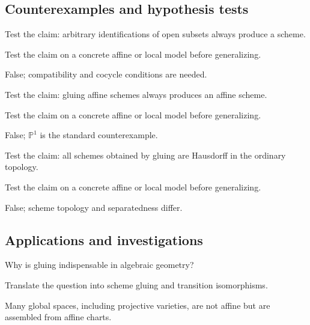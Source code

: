 \subsection*{Counterexamples and hypothesis tests}

\begin{exercise}\label{exr:vi20-expand-10}
Test the claim: arbitrary identifications of open subsets always produce a scheme.
\end{exercise}
\begin{hint}
Test the claim on a concrete affine or local model before generalizing.
\end{hint}
\begin{solution}
False; compatibility and cocycle conditions are needed.
\end{solution}

\begin{exercise}\label{exr:vi20-expand-11}
Test the claim: gluing affine schemes always produces an affine scheme.
\end{exercise}
\begin{hint}
Test the claim on a concrete affine or local model before generalizing.
\end{hint}
\begin{solution}
False; $\mathbb P^1$ is the standard counterexample.
\end{solution}

\begin{exercise}\label{exr:vi20-expand-12}
Test the claim: all schemes obtained by gluing are Hausdorff in the ordinary topology.
\end{exercise}
\begin{hint}
Test the claim on a concrete affine or local model before generalizing.
\end{hint}
\begin{solution}
False; scheme topology and separatedness differ.
\end{solution}

\subsection*{Applications and investigations}

\begin{exercise}\label{exr:vi20-expand-13}
Why is gluing indispensable in algebraic geometry?
\end{exercise}
\begin{hint}
Translate the question into scheme gluing and transition isomorphisms.
\end{hint}
\begin{solution}
Many global spaces, including projective varieties, are not affine but are assembled from affine charts.
\end{solution}

